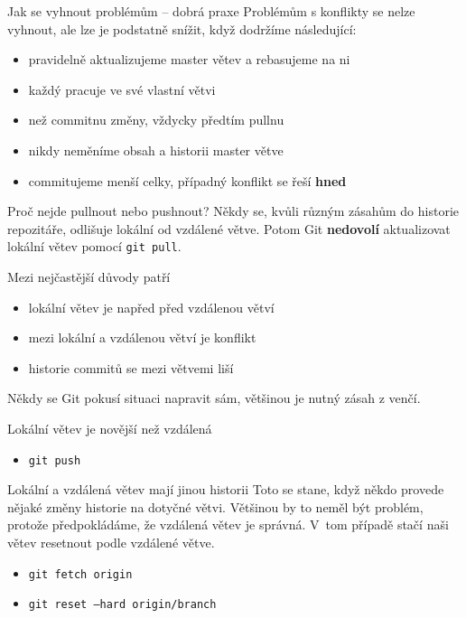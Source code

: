 \documentclass[14pt]{beamer}
\renewcommand{\texttt}[1]{{{\tt\color{blue}#1}}}
\begin{document}
	\begin{frame}{Jak se vyhnout problémům -- dobrá praxe}
	Problémům s konflikty se nelze vyhnout, ale lze je podstatně snížit, když dodržíme následující:
	\begin{itemize}
		\item pravidelně aktualizujeme master větev a rebasujeme na ni
		\item každý pracuje ve své vlastní větvi
		\item než commitnu změny, vždycky předtím pullnu
		\item nikdy neměníme obsah a historii master větve
		\item commitujeme menší celky, případný konflikt se řeší \textbf{hned}
	\end{itemize}
\end{frame}

\begin{frame}{Proč nejde pullnout nebo pushnout?}
	Někdy se, kvůli různým zásahům do historie repozitáře, odlišuje lokální od vzdálené větve. Potom Git \textbf{nedovolí} aktualizovat lokální větev pomocí \texttt{git pull}.
	
	Mezi nejčastější důvody patří
	\begin{itemize}
		\item lokální větev je napřed před vzdálenou větví 
		\item mezi lokální a vzdálenou větví je konflikt 		
		\item historie commitů se mezi větvemi liší
	\end{itemize}
	Někdy se Git pokusí situaci napravit sám, většinou je nutný zásah z venčí. 
\end{frame}

\begin{frame}{Lokální větev je novější než vzdálená}
	\begin{itemize}
		\item \texttt{git push}
	\end{itemize}
\end{frame}

\begin{frame}{Lokální a vzdálená větev mají jinou historii}
	Toto se stane, když někdo provede nějaké změny historie na dotyčné větvi. Většinou by to neměl být problém, protože předpokládáme, že vzdálená větev je správná. V~tom případě stačí naši větev resetnout podle vzdálené větve.
	\begin{itemize}
		\item \texttt{git fetch origin}
		\item \texttt{git reset --hard origin/branch}
	\end{itemize}
\end{frame}
\end{document}
